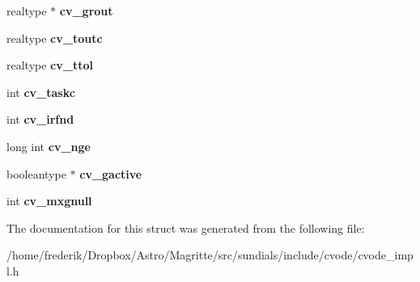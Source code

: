 \begin{DoxyCompactItemize}
realtype $\ast$ {\bfseries cv\+\_\+grout}
\item 
\mbox{\label{structCVodeMemRec_ae7424a7cdf1d5c4f490c4859d2aed323}} 
realtype {\bfseries cv\+\_\+toutc}
\item 
\mbox{\label{structCVodeMemRec_ae22c2bcc8f7d7629085c76700c5d662a}} 
realtype {\bfseries cv\+\_\+ttol}
\item 
\mbox{\label{structCVodeMemRec_aa45c25a49d1b2e258e6576cba6ccc88f}} 
int {\bfseries cv\+\_\+taskc}
\item 
\mbox{\label{structCVodeMemRec_adb4a41e3a1ae6c7d2b40b9ccf2b99699}} 
int {\bfseries cv\+\_\+irfnd}
\item 
\mbox{\label{structCVodeMemRec_abaf9174b5eb8e302a3a5efebf025b328}} 
long int {\bfseries cv\+\_\+nge}
\item 
\mbox{\label{structCVodeMemRec_ad9b9e991ce4b2e94ec7a19b25936b262}} 
booleantype $\ast$ {\bfseries cv\+\_\+gactive}
\item 
\mbox{\label{structCVodeMemRec_a5a3bc992cfd08a50e8a0d598f9eb1a18}} 
int {\bfseries cv\+\_\+mxgnull}
\end{DoxyCompactItemize}


The documentation for this struct was generated from the following file\+:\begin{DoxyCompactItemize}
\item 
/home/frederik/\+Dropbox/\+Astro/\+Magritte/src/sundials/include/cvode/cvode\+\_\+impl.\+h\end{DoxyCompactItemize}
